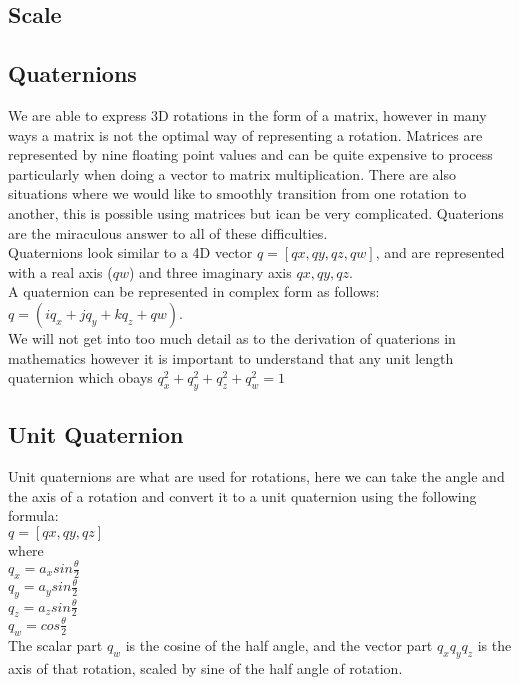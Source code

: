 \subsection{Scale}


\subsection{Quaternions}

\begin{flushleft}
We are able to express 3D rotations in the form of a matrix, however in many ways a matrix is not the optimal way of representing a rotation. Matrices are represented by nine floating point values and can be quite expensive to process particularly when doing a vector to matrix multiplication. There are also situations where we would like to smoothly transition from one rotation to another, this is possible using matrices but ican be very complicated. Quaterions are the miraculous answer to all of these difficulties.\\
Quaternions look similar to a 4D vector $ q = [qx, qy, qz, qw]$, and are represented with a real axis ($qw$) and three imaginary axis $qx, qy, qz$.\\
A quaternion can be represented in complex form as follows: $q = (iq_x + jq_y + kq_z + qw)$. \\ 
We will not get into too much detail as to the derivation of quaterions in mathematics however it is important to understand that any unit length quaternion which obays $q_x^2 + q_y^2 + q_z^2 + q_w^2 = 1$ \\ 

\end{flushleft}

\subsection{Unit Quaternion}
Unit quaternions are what are used for rotations, here we can take the angle and the axis of a rotation and convert it to a unit quaternion using the following formula: \\
$q = [qx, qy, qz]$\\
where\\
$q_x = a_x sin \frac{\theta}{2}$\\
$q_y = a_y sin \frac{\theta}{2}$\\
$q_z = a_z sin \frac{\theta}{2}$\\
$q_w = cos \frac{\theta}{2}$\\
The scalar part $q_w$ is the cosine of the half angle, and the vector part $q_x q_y q_z$ is the axis of that rotation, scaled by sine of the half angle of rotation.  

